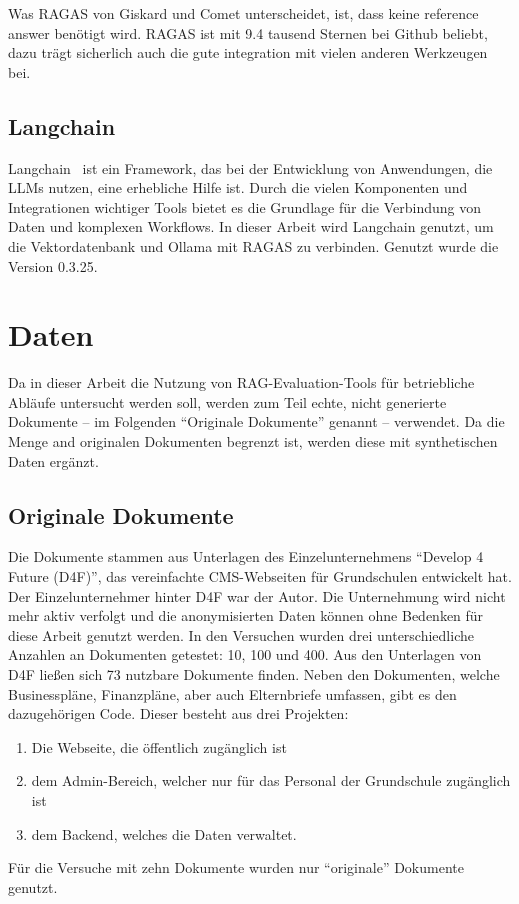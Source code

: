 Was RAGAS von Giskard und Comet unterscheidet, ist, dass keine \glqq reference answer\grqq{} benötigt wird.
RAGAS ist mit 9.4 tausend Sternen bei Github beliebt, dazu trägt sicherlich auch die gute integration mit vielen anderen Werkzeugen bei.

\subsection{Langchain}
Langchain~\cite{langchain_framework} ist ein Framework, das bei der Entwicklung von Anwendungen, die LLMs nutzen, eine erhebliche Hilfe ist.
Durch die vielen Komponenten und Integrationen wichtiger Tools bietet es die Grundlage für die Verbindung von Daten und komplexen Workflows.
In dieser Arbeit wird Langchain genutzt, um die Vektordatenbank und Ollama mit RAGAS zu verbinden. Genutzt wurde die Version 0.3.25.

\section{Daten}
Da in dieser Arbeit die Nutzung von RAG-Evaluation-Tools für betriebliche Abläufe untersucht werden soll, werden zum Teil echte, nicht generierte Dokumente – im Folgenden \enquote{Originale Dokumente} genannt – verwendet.
Da die Menge and originalen Dokumenten begrenzt ist, werden diese mit synthetischen Daten ergänzt.

\subsection{Originale Dokumente}
Die Dokumente stammen aus Unterlagen des Einzelunternehmens \enquote{Develop 4 Future (D4F)}, das vereinfachte CMS-Webseiten für Grundschulen entwickelt hat.
Der Einzelunternehmer hinter D4F war der Autor.
Die Unternehmung wird nicht mehr aktiv verfolgt und die anonymisierten Daten können ohne Bedenken für diese Arbeit genutzt werden.
In den Versuchen wurden drei unterschiedliche Anzahlen an Dokumenten getestet: 10, 100 und 400.
Aus den Unterlagen von D4F ließen sich 73 nutzbare Dokumente finden.
Neben den Dokumenten, welche Businesspläne, Finanzpläne, aber auch Elternbriefe umfassen, gibt es den dazugehörigen Code.
Dieser besteht aus drei Projekten:
\begin{enumerate}
    \item Die Webseite, die öffentlich zugänglich ist
    \item dem Admin-Bereich, welcher nur für das Personal der Grundschule zugänglich ist
    \item dem Backend, welches die Daten verwaltet.
\end{enumerate}
Für die Versuche mit zehn Dokumente wurden nur \enquote{originale} Dokumente genutzt.



